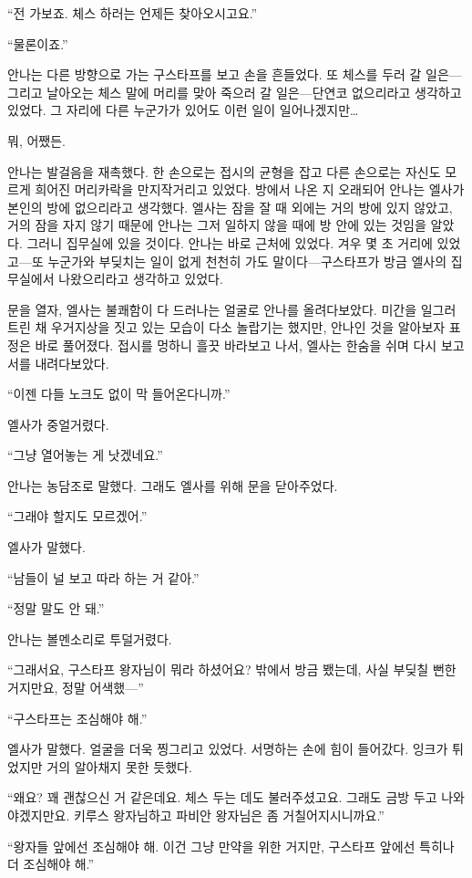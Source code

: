 ``전 가보죠. 체스 하러는 언제든 찾아오시고요.''

``물론이죠.''

안나는 다른 방향으로 가는 구스타프를 보고 손을 흔들었다. 또 체스를 두러 갈 일은—그리고 날아오는 체스 말에 머리를 맞아 죽으러 갈 일은—단연코 없으리라고 생각하고 있었다. 그 자리에 다른 누군가가 있어도 이런 일이 일어나겠지만\ldots

뭐, 어쨌든.

안나는 발걸음을 재촉했다. 한 손으로는 접시의 균형을 잡고 다른 손으로는 자신도 모르게 희어진 머리카락을 만지작거리고 있었다. 방에서 나온 지 오래되어 안나는 엘사가 본인의 방에 없으리라고 생각했다. 엘사는 잠을 잘 때 외에는 거의 방에 있지 않았고, 거의 잠을 자지 않기 때문에 안나는 그저 일하지 않을 때에 방 안에 있는 것임을 알았다. 그러니 집무실에 있을 것이다. 안나는 바로 근처에 있었다. 겨우 몇 초 거리에 있었고—또 누군가와 부딪치는 일이 없게 천천히 가도 말이다—구스타프가 방금 엘사의 집무실에서 나왔으리라고 생각하고 있었다.

문을 열자, 엘사는 불쾌함이 다 드러나는 얼굴로 안나를 올려다보았다. 미간을 일그러트린 채 우거지상을 짓고 있는 모습이 다소 놀랍기는 했지만, 안나인 것을 알아보자 표정은 바로 풀어졌다. 접시를 멍하니 흘끗 바라보고 나서, 엘사는 한숨을 쉬며 다시 보고서를 내려다보았다.

``이젠 다들 노크도 없이 막 들어온다니까.''

엘사가 중얼거렸다.

``그냥 열어놓는 게 낫겠네요.''

안나는 농담조로 말했다. 그래도 엘사를 위해 문을 닫아주었다.

``그래야 할지도 모르겠어.''

엘사가 말했다.

``남들이 널 보고 따라 하는 거 같아.''

``정말 말도 안 돼.''

안나는 볼멘소리로 투덜거렸다.

``그래서요, 구스타프 왕자님이 뭐라 하셨어요? 밖에서 방금 뵀는데, 사실 부딪칠 뻔한 거지만요, 정말 어색했—''

``구스타프는 조심해야 해.''

엘사가 말했다. 얼굴을 더욱 찡그리고 있었다. 서명하는 손에 힘이 들어갔다. 잉크가 튀었지만 거의 알아채지 못한 듯했다.

``왜요? 꽤 괜찮으신 거 같은데요. 체스 두는 데도 불러주셨고요. 그래도 금방 두고 나와야겠지만요. 키루스 왕자님하고 파비안 왕자님은 좀 거칠어지시니까요.''

``왕자들 앞에선 조심해야 해. 이건 그냥 만약을 위한 거지만, 구스타프 앞에선 특히나 더 조심해야 해.''

